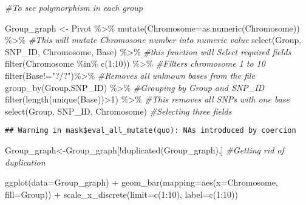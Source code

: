 \documentclass[
]{article}
\newenvironment{Shaded}{\begin{snugshade}}{\end{snugshade}}
\newcommand{\AttributeTok}[1]{\textcolor[rgb]{0.77,0.63,0.00}{#1}}
\newcommand{\CommentTok}[1]{\textcolor[rgb]{0.56,0.35,0.01}{\textit{#1}}}
\newcommand{\DecValTok}[1]{\textcolor[rgb]{0.00,0.00,0.81}{#1}}
\newcommand{\FunctionTok}[1]{\textcolor[rgb]{0.00,0.00,0.00}{#1}}
\newcommand{\NormalTok}[1]{#1}
\newcommand{\OtherTok}[1]{\textcolor[rgb]{0.56,0.35,0.01}{#1}}
\newcommand{\SpecialCharTok}[1]{\textcolor[rgb]{0.00,0.00,0.00}{#1}}
\newcommand{\StringTok}[1]{\textcolor[rgb]{0.31,0.60,0.02}{#1}}
\begin{document}
\begin{Shaded}
\begin{Highlighting}[]
\CommentTok{\#To see polymorphism in each group}

\NormalTok{Group\_graph }\OtherTok{\textless{}{-}}\NormalTok{ Pivot }\SpecialCharTok{\%\textgreater{}\%} 
  \FunctionTok{mutate}\NormalTok{(}\AttributeTok{Chromosome=}\FunctionTok{as.numeric}\NormalTok{(Chromosome)) }\SpecialCharTok{\%\textgreater{}\%} \CommentTok{\#This will mutate Chromosone number into numeric value}
  \FunctionTok{select}\NormalTok{(Group, SNP\_ID, Chromosome, Base) }\SpecialCharTok{\%\textgreater{}\%}  \CommentTok{\#this function will Select required fields}
  \FunctionTok{filter}\NormalTok{(Chromosome }\SpecialCharTok{\%in\%} \FunctionTok{c}\NormalTok{(}\DecValTok{1}\SpecialCharTok{:}\DecValTok{10}\NormalTok{)) }\SpecialCharTok{\%\textgreater{}\%}  \CommentTok{\#Filters chromosome 1 to 10}
  \FunctionTok{filter}\NormalTok{(Base}\SpecialCharTok{!=}\StringTok{"?/?"}\NormalTok{)}\SpecialCharTok{\%\textgreater{}\%}   \CommentTok{\#Removes all unknown bases from the file}
  \FunctionTok{group\_by}\NormalTok{(Group,SNP\_ID) }\SpecialCharTok{\%\textgreater{}\%}  \CommentTok{\#Grouping by Group and SNP\_ID}
  \FunctionTok{filter}\NormalTok{(}\FunctionTok{length}\NormalTok{(}\FunctionTok{unique}\NormalTok{(Base))}\SpecialCharTok{\textgreater{}}\DecValTok{1}\NormalTok{) }\SpecialCharTok{\%\textgreater{}\%}   \CommentTok{\#This removes all SNPs with one base}
  \FunctionTok{select}\NormalTok{(Group, SNP\_ID, Chromosome) }\CommentTok{\#Selecting three fields}
\end{Highlighting}
\end{Shaded}

\begin{verbatim}
## Warning in mask$eval_all_mutate(quo): NAs introduced by coercion
\end{verbatim}

\begin{Shaded}
\begin{Highlighting}[]
\NormalTok{Group\_graph}\OtherTok{\textless{}{-}}\NormalTok{Group\_graph[}\SpecialCharTok{!}\FunctionTok{duplicated}\NormalTok{(Group\_graph),] }\CommentTok{\#Getting rid of duplication}

\FunctionTok{ggplot}\NormalTok{(}\AttributeTok{data=}\NormalTok{Group\_graph) }\SpecialCharTok{+}
  \FunctionTok{geom\_bar}\NormalTok{(}\AttributeTok{mapping=}\FunctionTok{aes}\NormalTok{(}\AttributeTok{x=}\NormalTok{Chromosome, }\AttributeTok{fill=}\NormalTok{Group)) }\SpecialCharTok{+} 
  \FunctionTok{scale\_x\_discrete}\NormalTok{(}\AttributeTok{limit=}\FunctionTok{c}\NormalTok{(}\DecValTok{1}\SpecialCharTok{:}\DecValTok{10}\NormalTok{), }\AttributeTok{label=}\FunctionTok{c}\NormalTok{(}\DecValTok{1}\SpecialCharTok{:}\DecValTok{10}\NormalTok{))}
\end{Highlighting}
\end{Shaded}
\end{document}
